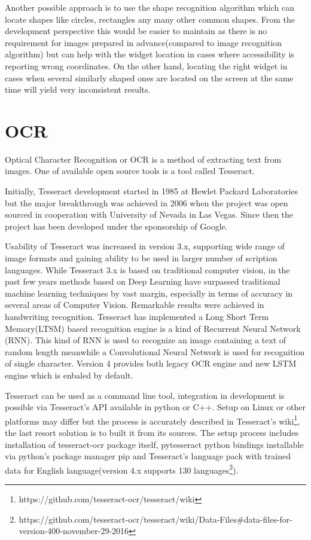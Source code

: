 Another possible approach is to use the shape recognition algorithm which can locate shapes like circles, rectangles any many other common shapes. From the development perspective this would be easier to maintain as there is no requirement for images prepared in advance(compared to image recognition algorithm) but can help with the widget location in cases where accessibility is reporting wrong coordinates. On the other hand, locating the right widget in cases when several similarly shaped ones are located on the screen at the same time will yield very inconsistent results.


\section{OCR}
Optical Character Recognition or OCR is a method of extracting text from images. One of available open source tools is a tool called Tesseract.

Initially, Tesseract development started in 1985 at Hewlet Packard Laboratories but the major breakthrough was achieved in 2006 when the project was open sourced in cooperation with University of Nevada in Las Vegas. Since then the project has been developed under the sponsorship of Google\cite{tesseract_history}.

Usability of Tesseract was increased in version 3.x, supporting wide range of image formats and gaining ability to be used in larger number of scription languages. While Tesseract 3.x is based on traditional computer vision, in the past few years methods based on Deep Learning have surpassed traditional machine learning techniques by vast margin, especially in terms of accuracy in several areas of Computer Vision. Remarkable results were achieved in handwriting recognition. Tesseract has implemented a Long Short Term Memory(LTSM) based recognition engine is a kind of Recurrent Neural Network (RNN). This kind of RNN is used to recognize an image containing a text of random length meanwhile a Convolutional Neural Network is used for recognition of single character. Version 4 provides both legacy OCR engine and new LSTM engine which is enbaled by default.\cite{tesseract}

Tesseract can be used as a command line tool, integration in development is possible via Tesseract's API available in python or C++. Setup on Linux or other platforms may differ but the process is accurately described in Tesseract's wiki\footnote{https://github.com/tesseract-ocr/tesseract/wiki}, the last resort solution is to built it from its sources.
The setup process includes installation of tesseract-ocr package itself, pytesseract python bindings installable via python's package manager pip and Tesseract's language pack with trained data for English language(version 4.x supports 130 languages\footnote{https://github.com/tesseract-ocr/tesseract/wiki/Data-Files#data-files-for-version-400-november-29-2016}). 

